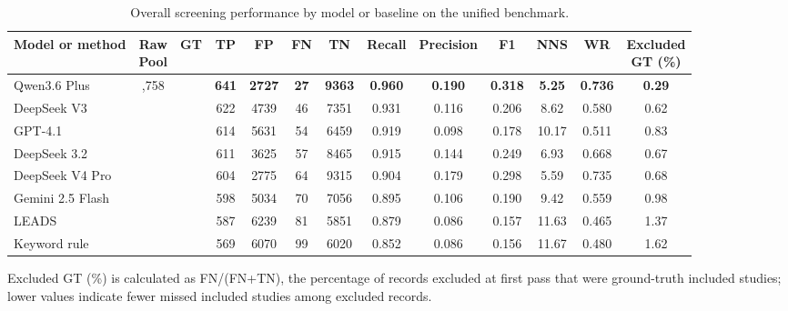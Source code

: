 \begin{table}[H]
\centering
\caption{Overall screening performance by model or baseline on the unified benchmark.}
\label{tab:model-summary}
\scriptsize
\setlength{\tabcolsep}{3.2pt}
\begin{tabular}{lcccccccccccc}
\toprule
Model or method & \makecell[c]{Raw\\Pool} & GT & TP & FP & FN & TN & Recall & Precision & F1 & NNS & WR & \makecell[c]{Excluded\\GT (\%)} \\
\midrule
Qwen3.6 Plus & \multirow[c]{8}{0.070\textwidth}{\centering 12,758} & \multirow[c]{8}{0.040\textwidth}{\centering 668} & \textbf{641} & \textbf{2727} & \textbf{27} & \textbf{9363} & \textbf{0.960} & \textbf{0.190} & \textbf{0.318} & \textbf{5.25} & \textbf{0.736} & \textbf{0.29} \\
DeepSeek V3 &  &  & 622 & 4739 & 46 & 7351 & 0.931 & 0.116 & 0.206 & 8.62 & 0.580 & 0.62 \\
GPT-4.1 &  &  & 614 & 5631 & 54 & 6459 & 0.919 & 0.098 & 0.178 & 10.17 & 0.511 & 0.83 \\
DeepSeek 3.2 &  &  & 611 & 3625 & 57 & 8465 & 0.915 & 0.144 & 0.249 & 6.93 & 0.668 & 0.67 \\
DeepSeek V4 Pro &  &  & 604 & 2775 & 64 & 9315 & 0.904 & 0.179 & 0.298 & 5.59 & 0.735 & 0.68 \\
Gemini 2.5 Flash &  &  & 598 & 5034 & 70 & 7056 & 0.895 & 0.106 & 0.190 & 9.42 & 0.559 & 0.98 \\
LEADS &  &  & 587 & 6239 & 81 & 5851 & 0.879 & 0.086 & 0.157 & 11.63 & 0.465 & 1.37 \\
Keyword rule &  &  & 569 & 6070 & 99 & 6020 & 0.852 & 0.086 & 0.156 & 11.67 & 0.480 & 1.62 \\
\bottomrule
\end{tabular}
\vspace{0.25em}
\parbox{0.96\textwidth}{\footnotesize Excluded GT (\%) is calculated as FN/(FN+TN), the percentage of records excluded at first pass that were ground-truth included studies; lower values indicate fewer missed included studies among excluded records.}
\end{table}
